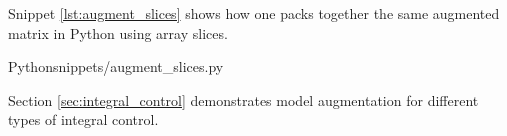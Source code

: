 Snippet \ref{lst:augment_slices} shows how one packs together the same augmented
matrix in Python using array slices.
\begin{code}{Python}{snippets/augment_slices.py}
  \caption{Matrix augmentation example: array slices}
  \label{lst:augment_slices}
\end{code}

Section \ref{sec:integral_control} demonstrates \gls{model} augmentation for
different types of integral control.
